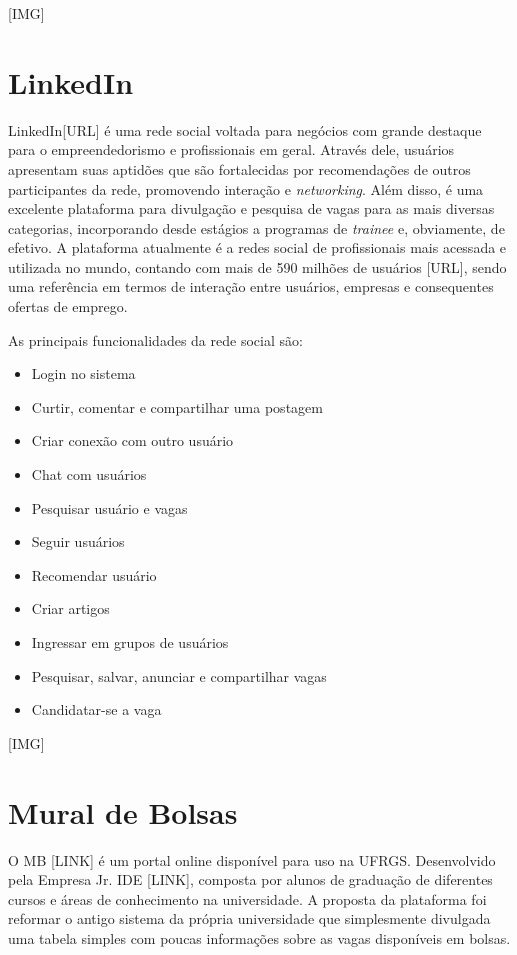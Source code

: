 \documentclass[cic,tc]{iiufrgs}
\begin{document}
[IMG]

\section{LinkedIn}
\label{trabRelLinkedin}

LinkedIn[URL] é uma rede social voltada para negócios com grande destaque para o empreendedorismo e profissionais em geral. Através dele, usuários apresentam suas aptidões que são fortalecidas por recomendações de outros participantes da rede, promovendo interação e \textit{networking}. Além disso, é uma excelente plataforma para divulgação e pesquisa de vagas para as mais diversas categorias, incorporando desde estágios a programas de \textit{trainee} e, obviamente, de efetivo. A plataforma atualmente é a redes social de profissionais mais acessada e utilizada no mundo, contando com mais de 590 milhões de usuários [URL], sendo uma referência em termos de interação entre usuários, empresas e consequentes ofertas de emprego.

As principais funcionalidades da rede social são:
\begin{itemize}
    \item Login no sistema
    \item Curtir, comentar e compartilhar uma postagem
    \item Criar conexão com outro usuário
    \item Chat com usuários
    \item Pesquisar usuário e vagas
    \item Seguir usuários
    \item Recomendar usuário
    \item Criar artigos
    \item Ingressar em grupos de usuários
    \item Pesquisar, salvar, anunciar e compartilhar vagas
    \item Candidatar-se a vaga
\end{itemize}


[IMG]

\section{Mural de Bolsas}
\label{trabRelMDB}

O MB [LINK] é um portal online disponível para uso na UFRGS. Desenvolvido pela Empresa Jr. IDE [LINK], composta por alunos de graduação de diferentes cursos e áreas de conhecimento na universidade. A proposta da plataforma foi reformar o antigo sistema da própria universidade que simplesmente divulgada uma tabela simples com poucas informações sobre as vagas disponíveis em bolsas. 
\end{document}
